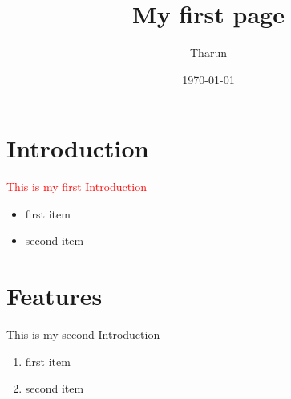 \documentclass{article}
\title{My first page}
\author{Tharun}
\date{\today}
\begin{document}
\maketitle
\section{Introduction}	
{\huge \textcolor{red}{This is my first Introduction}}
\begin{itemize}
	\item first item
	\item second item
\end{itemize}

\section{Features}
This is my second Introduction
\begin{enumerate}
	\item first item
	\item second item
\end{enumerate}	
	
\end{document}
